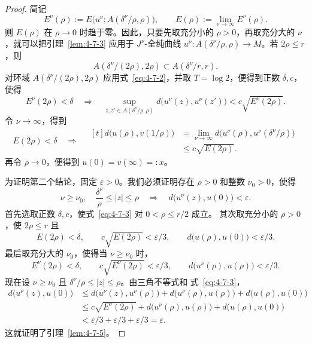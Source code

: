 \begin{proof}
简记
\[
  E^\nu(\rho):=E\bigl(u^\nu;A(\delta^\nu/\rho,\rho)\bigr),
  \qquad
  E(\rho):=\lim_{\nu\to\infty}E^\nu(\rho).
\]
则 $E(\rho)$ 在 $\rho\to0$ 时趋于零。因此，只要先取充分小的 $\rho>0$，再取充分大的
$\nu$，就可以把引理~\ref{lem:4-7-3} 应用于
$J^\nu$-全纯曲线 $u^\nu:A(\delta^\nu/\rho,\rho)\to M$。若 $2\rho\le r$，则
\[
  A(\delta^\nu/(2\rho),2\rho)\subset A(\delta^\nu/r,r).
\]
对环域 $A(\delta^\nu/(2\rho),2\rho)$ 应用式~\eqref{eq:4-7-2}，并取
$T=\log2$，便得到正数 $\delta,c$，使得
\begin{equation}\label{eq:4-7-3}
  E^\nu(2\rho)<\delta
  \quad\Longrightarrow\quad
  \sup_{z,z'\in A(\delta^\nu/\rho,\rho)}
  d\bigl(u^\nu(z),u^\nu(z')\bigr)
  <c\sqrt{E^\nu(2\rho)}.
\end{equation}
令 $\nu\to\infty$，得到
\[
  E(2\rho)<\delta
  \quad\Longrightarrow\quad
  \begin{aligned}[t]
  d\bigl(u(\rho),v(1/\rho)\bigr)
  &=\lim_{\nu\to\infty}
    d\bigl(u^\nu(\rho),u^\nu(\delta^\nu/\rho)\bigr)\\
  &\le c\sqrt{E(2\rho)}.
  \end{aligned}
\]
再令 $\rho\to0$，便得到 $u(0)=v(\infty)=:x$。

为证明第二个结论，固定 $\varepsilon>0$。我们必须证明存在 $\rho>0$ 和整数
$\nu_0>0$，使得
\[
  \nu\ge\nu_0,
  \quad\frac{\delta^\nu}{\rho}\le|z|\le\rho
  \quad\Longrightarrow\quad
  d\bigl(u^\nu(z),u(0)\bigr)<\varepsilon.
\]
首先选取正数 $\delta,c$，使式~\eqref{eq:4-7-3} 对 $0<\rho\le r/2$ 成立。
其次取充分小的 $\rho>0$，使 $2\rho\le r$ 且
\[
  E(2\rho)<\delta,
  \qquad c\sqrt{E(2\rho)}<\varepsilon/3,
  \qquad d\bigl(u(\rho),u(0)\bigr)<\varepsilon/3.
\]
最后取充分大的 $\nu_0$，使得当 $\nu\ge\nu_0$ 时，
\[
  E^\nu(2\rho)<\delta,
  \qquad c\sqrt{E^\nu(2\rho)}<\varepsilon/3,
  \qquad d\bigl(u^\nu(\rho),u(\rho)\bigr)<\varepsilon/3.
\]
现在设 $\nu\ge\nu_0$ 且 $\delta^\nu/\rho\le|z|\le\rho$。由三角不等式和
式~\eqref{eq:4-7-3}，
\[
  \begin{aligned}
  d\bigl(u^\nu(z),u(0)\bigr)
  &\le d\bigl(u^\nu(z),u^\nu(\rho)\bigr)
    +d\bigl(u^\nu(\rho),u(\rho)\bigr)
    +d\bigl(u(\rho),u(0)\bigr)\\
  &\le c\sqrt{E^\nu(2\rho)}
    +d\bigl(u^\nu(\rho),u(\rho)\bigr)
    +d\bigl(u(\rho),u(0)\bigr)\\
  &<\varepsilon/3+\varepsilon/3+\varepsilon/3=\varepsilon.
  \end{aligned}
\]
这就证明了引理~\ref{lem:4-7-5}。
\end{proof}


